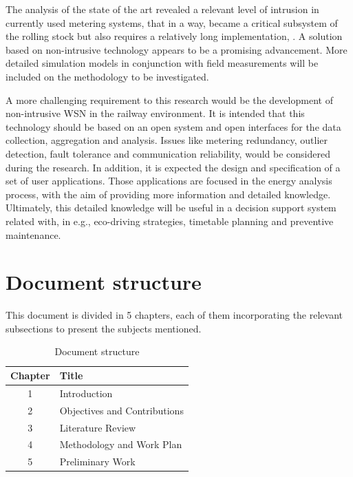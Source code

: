 
The analysis of the state of the art revealed a relevant level of intrusion in currently used metering systems, that in a way, became a critical subsystem of the rolling stock but also requires a relatively long implementation, \cite{shift2rail2015}. 
A solution based on non-intrusive technology appears to be a promising advancement. More detailed simulation models in conjunction with field measurements will be included on the methodology to be investigated.




A more challenging requirement to this research would be the development of non-intrusive  \ac{WSN}  in the railway environment. 
It is intended that this technology should be based on an open system and open interfaces for the data collection, aggregation and analysis. 
Issues like metering redundancy, outlier detection, fault tolerance and communication reliability, would be considered during the research.
In addition, it is expected the design and specification of a set of user applications.
Those applications are focused in the energy analysis process, with the aim of providing more information and detailed knowledge.
Ultimately, this detailed knowledge will be useful in a decision support system related with, in e.g., eco-driving strategies, timetable planning and preventive maintenance.

\newpage

\section{Document structure}

This document is divided in 5 chapters, each of them incorporating the relevant subsections to present the subjects mentioned. 

\begin{table}[!h]
	\label{tb:struct}
	\centering
	\caption{Document structure}
	\vspace{0.2em}
	\begin{tabular}{c|l}%
		\textbf{Chapter} & \textbf{Title}                    \\ \hline
		1       &                   Introduction             \\ \hline
		2       &                   Objectives and Contributions    \\ \hline
		3       &                   Literature Review    \\ \hline
		4       &                   Methodology and Work Plan       \\ \hline
		5       &                   Preliminary Work       \\
	\end{tabular}
\end{table}